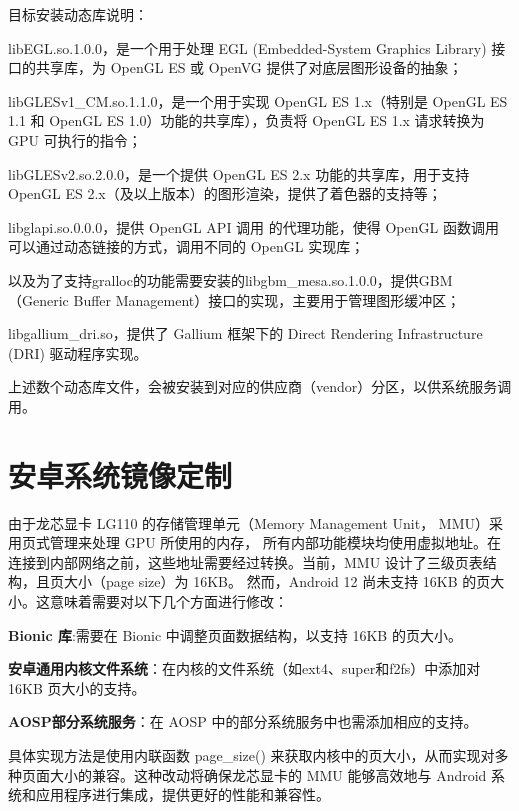 目标安装动态库说明：

libEGL.so.1.0.0，是一个用于处理 EGL (Embedded-System Graphics Library) 接口的共享库，为 OpenGL ES 或 OpenVG 提供了对底层图形设备的抽象；

libGLESv1\_CM.so.1.1.0，是一个用于实现 OpenGL ES 1.x（特别是 OpenGL ES 1.1 和 OpenGL ES 1.0）功能的共享库），负责将 OpenGL ES 1.x 请求转换为 GPU 可执行的指令；

libGLESv2.so.2.0.0，是一个提供 OpenGL ES 2.x 功能的共享库，用于支持 OpenGL ES 2.x（及以上版本）的图形渲染，提供了着色器的支持等；

libglapi.so.0.0.0，提供 OpenGL API 调用 的代理功能，使得 OpenGL 函数调用可以通过动态链接的方式，调用不同的 OpenGL 实现库；

以及为了支持gralloc的功能需要安装的libgbm\_mesa.so.1.0.0，提供GBM（Generic Buffer Management）接口的实现，主要用于管理图形缓冲区；

libgallium\_dri.so，提供了 Gallium 框架下的 Direct Rendering Infrastructure (DRI) 驱动程序实现。

上述数个动态库文件，会被安装到对应的供应商（vendor）分区，以供系统服务调用。

\section{安卓系统镜像定制}
由于龙芯显卡 LG110 的存储管理单元（Memory Management Unit， MMU）采用页式管理来处理 GPU 所使用的内存，
所有内部功能模块均使用虚拟地址。在连接到内部网络之前，这些地址需要经过转换。当前，MMU 设计了三级页表结构，且页大小（page size）为 16KB。
然而，Android 12 尚未支持 16KB 的页大小。这意味着需要对以下几个方面进行修改：

\textbf{Bionic 库}:需要在 Bionic 中调整页面数据结构，以支持 16KB 的页大小。

\textbf{安卓通用内核文件系统}：在内核的文件系统（如ext4、super和f2fs）中添加对 16KB 页大小的支持。

\textbf{AOSP部分系统服务}：在 AOSP 中的部分系统服务中也需添加相应的支持。

具体实现方法是使用内联函数 page\_size() 来获取内核中的页大小，从而实现对多种页面大小的兼容。这种改动将确保龙芯显卡的 MMU 
能够高效地与 Android 系统和应用程序进行集成，提供更好的性能和兼容性。


